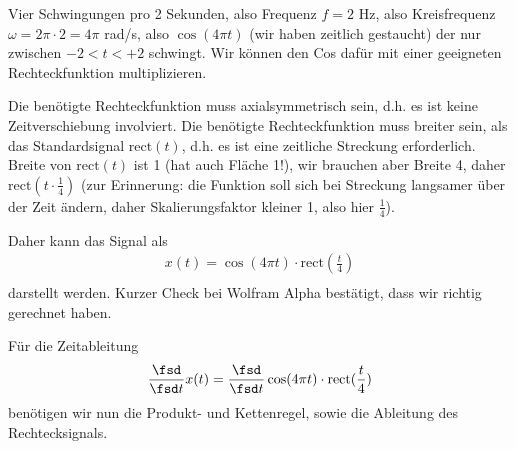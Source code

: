 \begin{ExCalc}
Vier Schwingungen pro 2 Sekunden, also Frequenz $f=2$ Hz, also Kreisfrequenz
$\omega=2\pi\cdot 2 = 4\pi$ rad/s, also $\cos(4\pi t)$ (wir haben zeitlich gestaucht)
der nur zwischen $-2 < t < +2$ schwingt. Wir können den Cos dafür mit einer
geeigneten Rechteckfunktion multiplizieren.

Die benötigte Rechteckfunktion muss axialsymmetrisch sein, d.h. es ist keine
Zeitverschiebung involviert.
Die benötigte Rechteckfunktion muss breiter sein, als das Standardsignal
$\mathrm{rect}(t)$, d.h. es ist eine zeitliche Streckung erforderlich.
Breite von $\mathrm{rect}(t)$ ist 1 (hat auch Fläche 1!), wir brauchen aber
Breite 4, daher $\mathrm{rect}(t\cdot \frac{1}{4})$ (zur Erinnerung:
die Funktion soll sich bei Streckung langsamer über der Zeit ändern, daher
Skalierungsfaktor kleiner 1, also hier $\frac{1}{4}$).

Daher kann das Signal als
\begin{align}
x(t) = \cos(4\pi t) \cdot \mathrm{rect}(\frac{t}{4})\\
\end{align}
darstellt werden. Kurzer Check bei Wolfram Alpha bestätigt, dass wir richtig
gerechnet haben.

Für die Zeitableitung
\begin{align}
\frac{\fsd }{\fsd t} x(t) =
\frac{\fsd }{\fsd t} \cos(4\pi t) \cdot \mathrm{rect}(\frac{t}{4})\\
\end{align}
benötigen wir nun die Produkt- und Kettenregel, sowie die Ableitung des Rechtecksignals.
%


\end{ExCalc}
